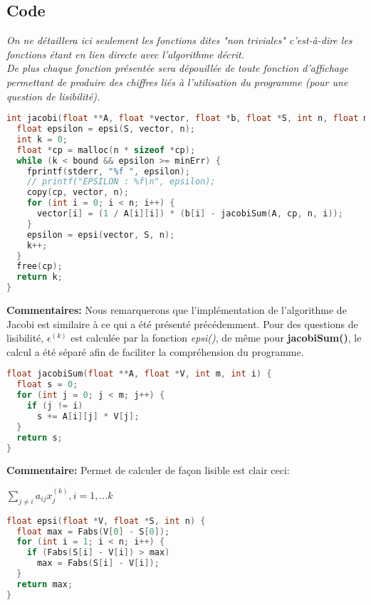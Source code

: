 \subsection{Code}
\textit{On ne détaillera ici seulement les fonctions dites "non triviales" c'est-à-dire les fonctions étant en lien directe avec l'algorithme décrit.\\De plus chaque fonction présentée sera dépouillée de toute fonction d'affichage permettant de produire des chiffres liés à l'utilisation du programme (pour une question de lisibilité).}
\begin{lstlisting}[language=C,inputencoding=utf8, basicstyle=\fontsize{8}{10}\selectfont,caption=jacobi.c]
int jacobi(float **A, float *vector, float *b, float *S, int n, float minErr,int bound){
  float epsilon = epsi(S, vector, n);
  int k = 0;
  float *cp = malloc(n * sizeof *cp);
  while (k < bound && epsilon >= minErr) {
    fprintf(stderr, "%f ", epsilon);
    // printf("EPSILON : %f\n", epsilon);
    copy(cp, vector, n);
    for (int i = 0; i < n; i++) {
      vector[i] = (1 / A[i][i]) * (b[i] - jacobiSum(A, cp, n, i));
    }
    epsilon = epsi(vector, S, n);
    k++;
  }
  free(cp);
  return k;
}

\end{lstlisting}
\textbf{Commentaires:} Nous remarquerons que l'implémentation de l'algorithme de Jacobi est similaire à ce qui a été présenté précédemment. Pour des questions de lisibilité, $\epsilon^{(k)}$ est calculée par la fonction \textit{epsi()}, de même pour \textbf{jacobiSum()}, le calcul a été séparé afin de faciliter la compréhension du programme.
\begin{lstlisting}[language=C,inputencoding=utf8, basicstyle=\fontsize{8}{10}\selectfont,caption=jacobiSum() function in "source.h"]
float jacobiSum(float **A, float *V, int m, int i) {
  float s = 0;
  for (int j = 0; j < m; j++) {
    if (j != i)
      s += A[i][j] * V[j];
  }
  return s;
}
\end{lstlisting}
\textbf{Commentaire:} Permet de calculer de façon lisible est clair ceci: \\
\begin{center}
$\sum \limits_{j \neq i} a_{ij}x_j^{(k)}, i=1,\ldots k$
\end{center}
\newpage
\begin{lstlisting}[language=C,inputencoding=utf8, basicstyle=\fontsize{8}{10}\selectfont,caption=epsi() function in "source.h"]
float epsi(float *V, float *S, int n) {
  float max = Fabs(V[0] - S[0]);
  for (int i = 1; i < n; i++) {
    if (Fabs(S[i] - V[i]) > max)
      max = Fabs(S[i] - V[i]);
  }
  return max;
}
\end{lstlisting}
